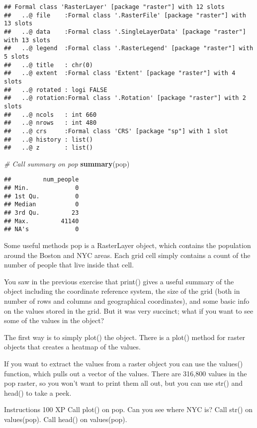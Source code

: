 \documentclass[]{article}
\newenvironment{Shaded}{\begin{snugshade}}{\end{snugshade}}
\newcommand{\CommentTok}[1]{\textcolor[rgb]{0.56,0.35,0.01}{\textit{#1}}}
\newcommand{\KeywordTok}[1]{\textcolor[rgb]{0.13,0.29,0.53}{\textbf{#1}}}
\newcommand{\NormalTok}[1]{#1}
\begin{document}
\begin{verbatim}
## Formal class 'RasterLayer' [package "raster"] with 12 slots
##   ..@ file    :Formal class '.RasterFile' [package "raster"] with 13 slots
##   ..@ data    :Formal class '.SingleLayerData' [package "raster"] with 13 slots
##   ..@ legend  :Formal class '.RasterLegend' [package "raster"] with 5 slots
##   ..@ title   : chr(0) 
##   ..@ extent  :Formal class 'Extent' [package "raster"] with 4 slots
##   ..@ rotated : logi FALSE
##   ..@ rotation:Formal class '.Rotation' [package "raster"] with 2 slots
##   ..@ ncols   : int 660
##   ..@ nrows   : int 480
##   ..@ crs     :Formal class 'CRS' [package "sp"] with 1 slot
##   ..@ history : list()
##   ..@ z       : list()
\end{verbatim}

\begin{Shaded}
\begin{Highlighting}[]
\CommentTok{# Call summary on pop}
\KeywordTok{summary}\NormalTok{(pop)}
\end{Highlighting}
\end{Shaded}

\begin{verbatim}
##         num_people
## Min.             0
## 1st Qu.          0
## Median           0
## 3rd Qu.         23
## Max.         41140
## NA's             0
\end{verbatim}

Some useful methods pop is a RasterLayer object, which contains the
population around the Boston and NYC areas. Each grid cell simply
contains a count of the number of people that live inside that cell.

You saw in the previous exercise that print() gives a useful summary of
the object including the coordinate reference system, the size of the
grid (both in number of rows and columns and geographical coordinates),
and some basic info on the values stored in the grid. But it was very
succinct; what if you want to see some of the values in the object?

The first way is to simply plot() the object. There is a plot() method
for raster objects that creates a heatmap of the values.

If you want to extract the values from a raster object you can use the
values() function, which pulls out a vector of the values. There are
316,800 values in the pop raster, so you won't want to print them all
out, but you can use str() and head() to take a peek.

Instructions 100 XP Call plot() on pop. Can you see where NYC is? Call
str() on values(pop). Call head() on values(pop).
\end{document}
